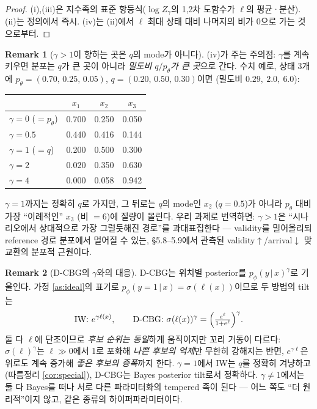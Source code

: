 \documentclass[11pt]{article}
\newcommand{\pth}{p_\theta}
\newcommand{\qexc}{q}
\theoremstyle{plain}
\theoremstyle{definition}
\newtheorem{remark}{Remark}
\begin{document}
\begin{proof}
(i),(iii)은 지수족의 표준 항등식($\log Z_\gamma$의 1,2차 도함수가 $\ell$의 평균·분산).
(ii)는 정의에서 즉시. (iv)는 (ii)에서 $\ell$ 최대 상태 대비 나머지의 비가 0으로 가는
것으로부터.
\end{proof}

\begin{remark}[$\gamma > 1$이 향하는 곳은 $\qexc$의 mode가 아니다]\label{rem:notq}
(iv)가 주는 주의점: $\gamma$를 계속 키우면 분포는 $\qexc$가 큰 곳이 아니라
\emph{밀도비 $\qexc/\pth$가 큰 곳}으로 간다. 수치 예로, 상태 3개에
$\pth = (0.70,\, 0.25,\, 0.05)$, $\qexc = (0.20,\, 0.50,\, 0.30)$이면
(밀도비 $0.29,\ 2.0,\ 6.0$):
\begin{center}
\begin{tabular}{lccc}
\toprule
 & $x_1$ & $x_2$ & $x_3$ \\
\midrule
$\gamma = 0$ \; ($= \pth$)      & 0.700 & 0.250 & 0.050 \\
$\gamma = 0.5$                  & 0.440 & 0.416 & 0.144 \\
$\gamma = 1$ \; ($= \qexc$)     & 0.200 & 0.500 & 0.300 \\
$\gamma = 2$                    & 0.020 & 0.350 & 0.630 \\
$\gamma = 4$                    & 0.000 & 0.058 & 0.942 \\
\bottomrule
\end{tabular}
\end{center}
$\gamma = 1$까지는 정확히 $\qexc$로 가지만, 그 뒤로는 $\qexc$의 mode인 $x_2$
($\qexc = 0.5$)가 아니라 $\pth$ 대비 가장 ``이례적인'' $x_3$ (비 $= 6$)에 질량이
몰린다. 우리 과제로 번역하면: $\gamma > 1$은 ``시나리오에서 상대적으로 가장 그럴듯해진
경로''를 과대표집한다 --- validity를 밀어올리되 reference 경로 분포에서 멀어질 수 있는,
\S5.8--5.9에서 관측된 validity$\uparrow$/arrival$\downarrow$ 맞교환의 분포적 근원이다.
\end{remark}

\begin{remark}[D-CBG의 $\gamma$와의 대응]\label{rem:dcbg}
D-CBG는 위치별 posterior를 $p_\phi(y\,|\,x)^{\gamma}$로 기울인다. 가정 \ref{as:ideal}의
표기로 $p_\phi(y{=}1\,|\,x) = \sigma(\ell(x))$이므로 두 방법의 tilt는
\[
\text{IW: } e^{\gamma \ell(x)}, \qquad
\text{D-CBG: } \sigma(\ell(x))^{\gamma} = \Bigl(\tfrac{e^{\ell}}{1+e^{\ell}}\Bigr)^{\gamma}.
\]
둘 다 $\ell$에 단조이므로 \emph{후보 순위는 동일}하게 움직이지만 꼬리 거동이 다르다:
$\sigma(\ell)^\gamma$는 $\ell \gg 0$에서 1로 포화해 \emph{나쁜 후보의 억제}만 무한히
강해지는 반면, $e^{\gamma\ell}$은 위로도 계속 증가해 \emph{좋은 후보의 증폭}까지 한다.
$\gamma = 1$에서 IW는 $\qexc$를 정확히 겨냥하고(따름정리 \ref{cor:special}), D-CBG는
Bayes posterior tilt로서 정확하다. $\gamma \ne 1$에서는 둘 다 Bayes를 떠나 서로 다른
파라미터화의 tempered 족이 된다 --- 어느 쪽도 ``더 원리적''이지 않고, 같은 종류의
하이퍼파라미터이다.
\end{remark}
\end{document}
